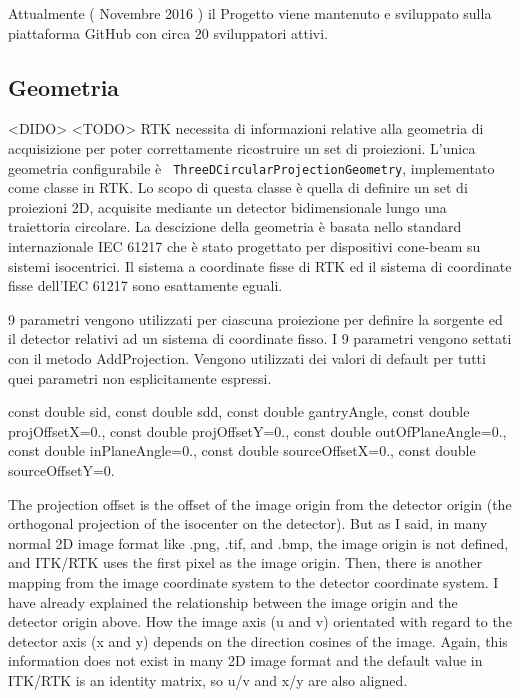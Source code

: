 \documentclass[a4paper,11pt, oneside]{article}
\begin{document}
                    Attualmente ( Novembre 2016 ) il Progetto viene mantenuto e sviluppato sulla piattaforma GitHub con circa 20 sviluppatori attivi.
                
                
            \subsection{Geometria}
                \par
                    <DIDO> <TODO>
                    RTK necessita di informazioni relative alla geometria di acquisizione per poter correttamente ricostruire un set di proiezioni. L'unica geometria configurabile è \texttt{ ThreeDCircularProjectionGeometry}, implementato come classe in RTK.
                    Lo scopo di questa classe è quella di definire un set di proiezioni 2D, acquisite mediante un detector bidimensionale lungo una traiettoria circolare. La descizione della geometria è basata nello standard internazionale IEC 61217 che è stato progettato per dispositivi cone-beam su sistemi isocentrici. Il sistema a coordinate fisse di RTK ed il sistema di coordinate fisse dell'IEC 61217 sono esattamente eguali. 
                    
                    9 parametri vengono utilizzati per ciascuna proiezione per definire la sorgente ed il detector relativi ad un sistema di coordinate fisso. I 9 parametri vengono settati con il metodo AddProjection. Vengono utilizzati dei valori di default per tutti quei parametri non esplicitamente espressi.
                        
                    const double sid, const double sdd, const double gantryAngle, const double projOffsetX=0., const double projOffsetY=0., const double outOfPlaneAngle=0., const double inPlaneAngle=0., const double sourceOffsetX=0., const double sourceOffsetY=0.
                        
                    The projection offset is the offset of the image origin from the
                    detector origin (the orthogonal projection of the isocenter on the
                    detector). But as I said, in many normal 2D image
                    format like .png, .tif, and .bmp, the image origin is not defined, and
                    ITK/RTK uses the first pixel as the image origin.
                    Then, there is another mapping from the image coordinate system to the
                    detector coordinate system. I have already explained the relationship
                    between the image origin and the detector origin above. How the image
                    axis (u and v) orientated with regard to the detector axis (x and y)
                    depends on the direction cosines of the image. Again, this information
                    does not exist in many 2D image format and the default value in
                    ITK/RTK is an identity matrix, so u/v and x/y are also aligned.\cite{rtk-users-proj-offset}
                
\end{document}
